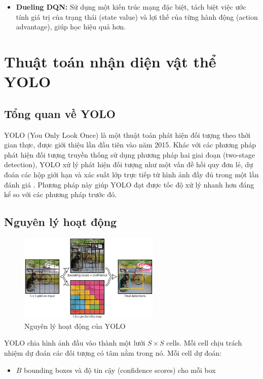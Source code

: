\begin{enumerate}
\begin{itemize}
    \item \textbf{Dueling DQN:} Sử dụng một kiến trúc mạng đặc biệt, tách biệt việc
        ước tính giá trị của trạng thái (state value) và lợi thế của từng hành động
        (action advantage), giúp học hiệu quả hơn.
\end{itemize}

\section{Thuật toán nhận diện vật thể YOLO}
\subsection{Tổng quan về YOLO}
YOLO (You Only Look Once) là một thuật toán phát hiện đối tượng theo thời gian thực,
được giới thiệu lần đầu tiên vào năm 2015. Khác với các phương pháp phát hiện
đối tượng truyền thống sử dụng phương pháp hai giai đoạn (two-stage detection), YOLO
xử lý phát hiện đối tượng như một vấn đề hồi quy đơn lẻ, dự đoán các hộp giới
hạn và xác suất lớp trực tiếp từ hình ảnh đầy đủ trong một lần đánh giá
\cite{Redmon2016}. Phương pháp này giúp YOLO đạt được tốc độ xử lý nhanh hơn đáng
kể so với các phương pháp trước đó.

\subsection{Nguyên lý hoạt động}

\begin{figure}[!htp]
    \centering
    \includegraphics[width=0.6\textwidth]{img/yolo_1}
    \caption{Nguyên lý hoạt động của YOLO}
    \label{fig:yolo_architecture}
\end{figure}

YOLO chia hình ảnh đầu vào thành một lưới $S \times S$ cells. Mỗi cell chịu
trách nhiệm dự đoán các đối tượng có tâm nằm trong nó. Mỗi cell dự đoán:
\begin{itemize}
    \item $B$ bounding boxes và độ tin cậy (confidence scores) cho mỗi box


\end{itemize}
\end{enumerate}
